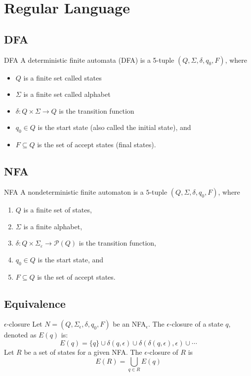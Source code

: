 \section{Regular Language}

\subsection{DFA}
\begin{Definition}{DFA}{}
	A deterministic finite automata (DFA) is a 5-tuple $(Q, \Sigma, \delta, q_0, F)$, where
	\begin{itemize}
		\item $Q$ is a finite set called states
		\item $\Sigma$ is a finite set called alphabet
		\item $\delta: Q \times \Sigma \rightarrow Q$ is the transition function
		\item $q_0 \in Q$ is the start state (also called the initial state), and
		\item $F \subseteq Q$ is the set of accept states (final states).
	\end{itemize}
\end{Definition}

\subsection{NFA}
\begin{Definition}{NFA}{}
	A nondeterministic finite automaton is a $5$-tuple $\left(Q, \Sigma, \delta, q_0, F\right)$, where
	\begin{enumerate}
		\item $Q$ is a finite set of states,
		\item $\Sigma$ is a finite alphabet,
		\item $\delta: Q \times \Sigma_{\varepsilon} \longrightarrow \mathcal{P}(Q)$ is the transition function,
		\item $q_0 \in Q$ is the start state, and
		\item $F \subseteq Q$ is the set of accept states.
	\end{enumerate}
\end{Definition}

\subsection{Equivalence}
\begin{Definition}{$\epsilon$-closure}{}
	Let $N = (Q, \Sigma_{\epsilon}, \delta, q_0, F)$ be an NFA$_{\epsilon}$.
	The $\epsilon$-closure of a state $q$, denoted as $E(q)$ is:
	\[
		E(q) = \{ q \} \cup \delta(q, \epsilon) \cup \delta(\delta(q, \epsilon), \epsilon) \cup \cdots
	\]
	Let $R$ be a set of states for a given NFA. The $\epsilon$-closure of $R$ is
	\[
		E(R) = \bigcup_{q \in R} E(q)
	\]
\end{Definition}

